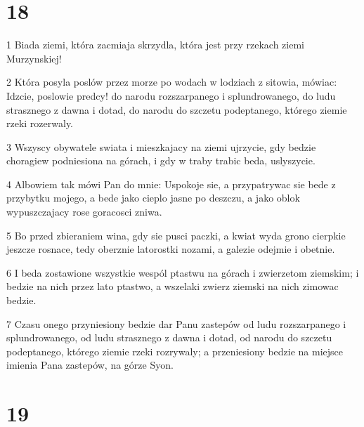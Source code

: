 \chapter{18}

\par 1 Biada ziemi, która zacmiaja skrzydla, która jest przy rzekach ziemi Murzynskiej!
\par 2 Która posyla poslów przez morze po wodach w lodziach z sitowia, mówiac: Idzcie, poslowie predcy! do narodu rozszarpanego i splundrowanego, do ludu strasznego z dawna i dotad, do narodu do szczetu podeptanego, którego ziemie rzeki rozerwaly.
\par 3 Wszyscy obywatele swiata i mieszkajacy na ziemi ujrzycie, gdy bedzie choragiew podniesiona na górach, i gdy w traby trabic beda, uslyszycie.
\par 4 Albowiem tak mówi Pan do mnie: Uspokoje sie, a przypatrywac sie bede z przybytku mojego, a bede jako cieplo jasne po deszczu, a jako oblok wypuszczajacy rose goracosci zniwa.
\par 5 Bo przed zbieraniem wina, gdy sie pusci paczki, a kwiat wyda grono cierpkie jeszcze rosnace, tedy oberznie latorostki nozami, a galezie odejmie i obetnie.
\par 6 I beda zostawione wszystkie wespól ptastwu na górach i zwierzetom ziemskim; i bedzie na nich przez lato ptastwo, a wszelaki zwierz ziemski na nich zimowac bedzie.
\par 7 Czasu onego przyniesiony bedzie dar Panu zastepów od ludu rozszarpanego i splundrowanego, od ludu strasznego z dawna i dotad, od narodu do szczetu podeptanego, którego ziemie rzeki rozrywaly; a przeniesiony bedzie na miejsce imienia Pana zastepów, na górze Syon.

\chapter{19}

